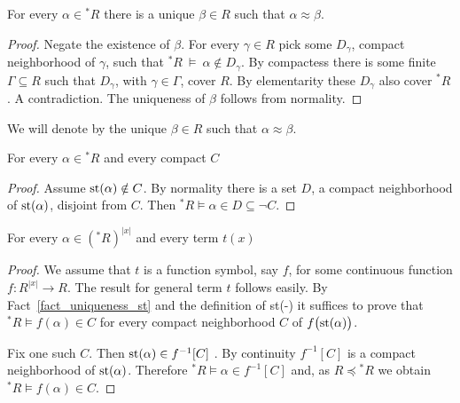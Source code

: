\documentclass[11pt,oneside]{amsart}
\renewcommand*{\emph}[1]{%
   \smash{\tikz[baseline]\node[rectangle, fill=teal!25, rounded corners, inner xsep=0.5ex, inner ysep=0.2ex, anchor=base, minimum height = 2.7ex]{#1};}}
\begin{document}
\begin{fact}\label{fact_uniqueness_st}
  For every $\alpha\in{}^*\!R$ there is a unique $\beta\in R$ such that $\alpha\approx\beta$.
\end{fact}

\begin{proof}
  Negate the existence of $\beta$.
  For every $\gamma\in R$ pick some $D_\gamma$, compact neighborhood of $\gamma$, such that ${}^*\!R\ \models\ \alpha\notin D_\gamma$.
  By compactess there is some finite $\Gamma\subseteq R$ such that $D_\gamma$, with $\gamma\in\Gamma$, cover $R$.
  By elementarity these $D_{\gamma}$ also cover ${}^*\!R$.
  A contradiction.
  The uniqueness of $\beta$ follows from normality.
\end{proof}

We will denote by \emph{${\rm st}(\alpha)$\/} the unique $\beta\in R$ such that $\alpha\approx\beta$.

\begin{fact}\label{fact_st1}
  For every $\alpha\in{}^*\! R$ and every compact $C$

\end{fact}

\begin{proof}
  Assume ${\rm st}(\alpha)\notin C$.
  By normality there is a set $D$, a compact neighborhood of ${\rm st}(\alpha)$, disjoint from $C$.
  Then  ${}^*\!R\models\alpha\in D\subseteq\neg C$.
\end{proof}

\begin{fact}\label{fact_terms_st}
  For every $\alpha\in({}^*\! R)^{|x|}$ and every term $t(x)$

\end{fact}

\begin{proof}
  We assume that $t$ is a function symbol, say $f$, for some continuous function $f:R^{|x|}\to R$.
  The result for general term $t$ follows easily.
  By Fact~\ref{fact_uniqueness_st} and the definition of st(-) it suffices to prove that ${}^*\!R\models f(\alpha)\in C$ for every compact neighborhood $C$ of $f\big({\rm st}(\alpha)\big)$.
  
  Fix one such $C$.
  Then ${\rm st}(\alpha)\in f^{-1}[C]$ .
  By continuity $f^{-1}[C]$ is a compact neighborhood of ${\rm st}(\alpha)$.
  Therefore ${}^*\!R\models \alpha\in f^{-1}[C]$ and, as $R\preceq{}^*\!R$ we obtain ${}^*\!R\models f(\alpha)\in C$.
\end{proof}
\end{document}
